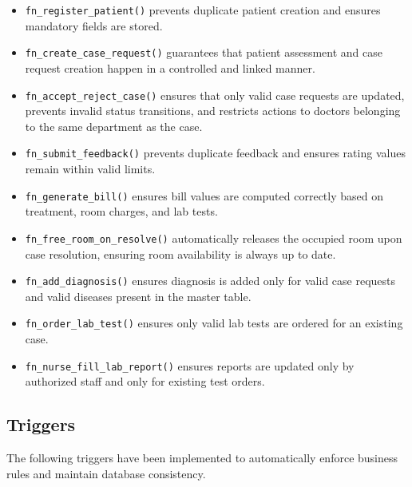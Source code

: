 \documentclass{article}
\begin{document}
\begin{itemize}[leftmargin=1.5cm]
    \item \texttt{fn\_register\_patient()} prevents duplicate patient creation and ensures mandatory fields are stored.

    \item \texttt{fn\_create\_case\_request()} guarantees that patient assessment and case request creation happen in a controlled and linked manner.

    \item \texttt{fn\_accept\_reject\_case()} ensures that only valid case requests are updated, prevents invalid status transitions, and restricts actions to doctors belonging to the same department as the case.

    \item \texttt{fn\_submit\_feedback()} prevents duplicate feedback and ensures rating values remain within valid limits.

    \item \texttt{fn\_generate\_bill()} ensures bill values are computed correctly based on treatment, room charges, and lab tests.

    \item \texttt{fn\_free\_room\_on\_resolve()} automatically releases the occupied room upon case resolution, ensuring room availability is always up to date.

    \item \texttt{fn\_add\_diagnosis()} ensures diagnosis is added only for valid case requests and valid diseases present in the master table.

    \item \texttt{fn\_order\_lab\_test()} ensures only valid lab tests are ordered for an existing case.

    \item \texttt{fn\_nurse\_fill\_lab\_report()} ensures reports are updated only by authorized staff and only for existing test orders.
\end{itemize}
%
\subsection{Triggers}

The following triggers have been implemented to automatically enforce business rules and maintain database consistency.
\end{document}
